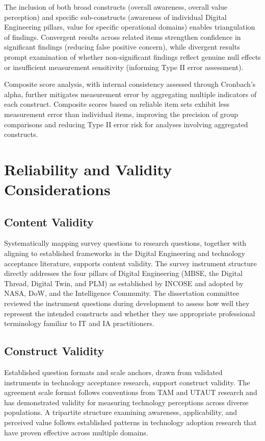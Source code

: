 The inclusion of both broad constructs (overall awareness, overall value perception) and specific sub-constructs (awareness of individual Digital Engineering pillars, value for specific operational domains) enables triangulation of findings. Convergent results across related items strengthen confidence in significant findings (reducing false positive concern), while divergent results prompt examination of whether non-significant findings reflect genuine null effects or insufficient measurement sensitivity (informing Type II error assessment).

Composite score analysis, with internal consistency assessed through Cronbach's alpha, further mitigates measurement error by aggregating multiple indicators of each construct. Composite scores based on reliable item sets exhibit less measurement error than individual items, improving the precision of group comparisons and reducing Type II error risk for analyses involving aggregated constructs.

\section{Reliability and Validity Considerations}

\subsection{Content Validity}

Systematically mapping survey questions to research questions, together with aligning to established frameworks in the Digital Engineering and technology acceptance literature, supports content validity. The survey instrument structure directly addresses the four pillars of Digital Engineering (MBSE, the Digital Thread, Digital Twin, and PLM) as established by INCOSE and adopted by NASA, DoW, and the Intelligence Community. The dissertation committee reviewed the instrument questions during development to assess how well they represent the intended constructs and whether they use appropriate professional terminology familiar to IT and IA practitioners. %

\subsection{Construct Validity}

Established question formats and scale anchors, drawn from validated instruments in technology acceptance research, support construct validity. The agreement scale format follows conventions from TAM and UTAUT research and has demonstrated validity for measuring technology perceptions across diverse populations. A tripartite structure examining awareness, applicability, and perceived value follows established patterns in technology adoption research that have proven effective across multiple domains.

